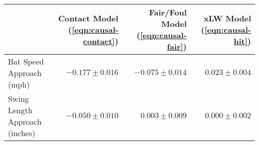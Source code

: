 \begin{tabular}{l|r|r|r|}
    & Contact Model (\ref{eqn:causal-contact}) & Fair/Foul Model (\ref{eqn:causal-fair}) & xLW Model (\ref{eqn:causal-hit})\\
  \hline
  Bat Speed Approach (mph) & $-0.177 \pm0.016$ & $-0.075 \pm0.014$ & $0.023 \pm0.004$ \\ 
  Swing Length Approach (inches) & $-0.050 \pm0.010$ & $0.003 \pm0.009$ & $0.000 \pm0.002$ 
\end{tabular}